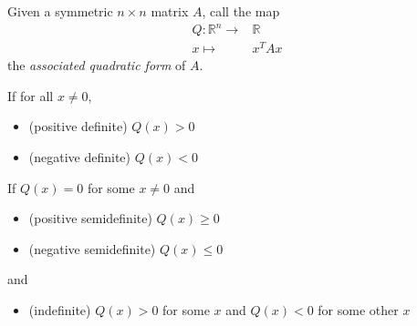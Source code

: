 \documentclass[12pt]{article}
\begin{document}
\begin{definition}
	Given a symmetric $n\times n$ matrix $A$, call the map 
	\begin{align*}
		Q: \mathbb{R}^n \to& \mathbb{R} \\
		x \mapsto& x^TAx
	\end{align*}
	the \emph{associated quadratic form} of $A$. 

	If for all $x\neq 0$, 
	\begin{itemize}
		\item (positive definite) $Q(x)>0$
		\item (negative definite) $Q(x)<0$
	\end{itemize}
	If $Q(x)=0$ for some $x\neq 0$ and 
	\begin{itemize}
		\item (positive semidefinite) $Q(x)\geq 0$
		\item (negative semidefinite) $Q(x)\leq 0$
	\end{itemize}
	and 
	\begin{itemize}
		\item (indefinite) $Q(x)>0$ for some $x$ and $Q(x)<0$ for some other $x$
	\end{itemize}
\end{definition}
\end{document}
